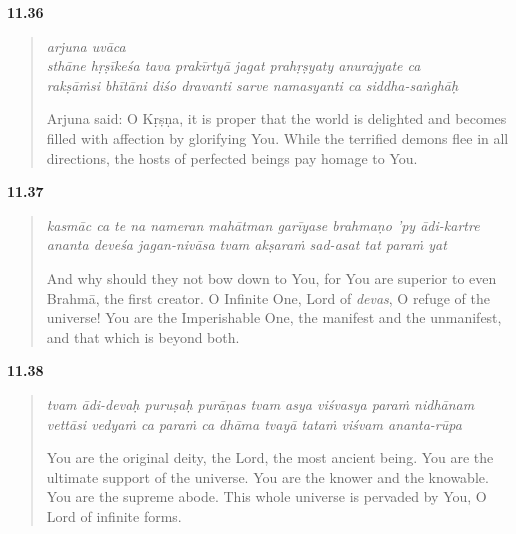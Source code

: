 \par\noindent\textbf{11.36}\par
\begin{verse}
\textit{arjuna uvāca} \\
\textit{sthāne hṛṣīkeśa tava prakīrtyā jagat prahṛṣyaty anurajyate ca} \\
\textit{rakṣāṁsi bhītāni diśo dravanti sarve namasyanti ca siddha-saṅghāḥ}

\noindent Arjuna said: O Kṛṣṇa, it is proper that the world is delighted and becomes filled with affection by glorifying You. While the terrified demons flee in all directions, the hosts of perfected beings pay homage to You.
\end{verse}
\par



\par\noindent\textbf{11.37}\par
\begin{verse}
\textit{kasmāc ca te na nameran mahātman garīyase brahmaṇo ’py ādi-kartre} \\
\textit{ananta deveśa jagan-nivāsa tvam akṣaraṁ sad-asat tat paraṁ yat}

\noindent And why should they not bow down to You, for You are superior to even Brahmā, the first creator. O Infinite One, Lord of \textit{devas}, O refuge of the universe! You are the Imperishable One, the manifest and the unmanifest, and that which is beyond both.
\end{verse}
\par



\par\noindent\textbf{11.38}\par
\begin{verse}
\textit{tvam ādi-devaḥ puruṣaḥ purāṇas tvam asya viśvasya paraṁ nidhānam} \\
\textit{vettāsi vedyaṁ ca paraṁ ca dhāma tvayā tataṁ viśvam ananta-rūpa}

\noindent You are the original deity, the Lord, the most ancient being. You are the ultimate support of the universe. You are the knower and the knowable. You are the supreme abode. This whole universe is pervaded by You, O Lord of infinite forms.
\end{verse}
\par



